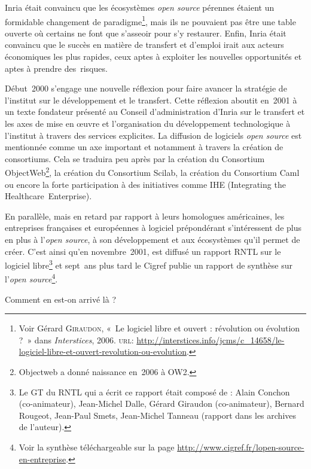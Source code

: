\documentclass{FramateX}
\begin{document}
\begin{refsection}
Inria était convaincu que les écosystèmes \textit{open source} pérennes
étaient un formidable changement de
paradigme\footnote{Voir Gérard \textsc{Giraudon}, «~Le
logiciel libre et ouvert : révolution ou évolution ?~» dans \textit{Interstices}, 2006. \textsc{url}: \url{http://interstices.info/jcms/c\_14658/le-logiciel-libre-et-ouvert-revolution-ou-evolution}.}, mais ils ne pouvaient pas être une table ouverte où certains ne font que
s'asseoir pour s'y restaurer. Enfin, Inria était convaincu que le
succès en matière de transfert et d'emploi irait aux acteurs
économiques les plus rapides, ceux aptes à exploiter les nouvelles
opportunités et aptes à prendre des~risques.

Début~2000 s'engage une nouvelle réflexion pour faire avancer la
stratégie de l'institut sur le développement et le transfert. Cette
réflexion aboutit en~2001 à un texte fondateur présenté au Conseil
d'administration d'Inria sur le transfert et les axes de mise en œuvre
et l'organisation du développement technologique à l'institut à travers
des services explicites. La diffusion de logiciels \textit{open source}
est mentionnée comme un axe important et notamment à travers la
création de consortiums. Cela se traduira peu après par la création du
Consortium ObjectWeb\footnote{Objectweb a
donné naissance en~2006 à OW2.}, la création du Consortium Scilab, la
création du Consortium Caml ou encore la forte participation à des
initiatives comme IHE (Integrating the Healthcare~Enterprise).


En parallèle, mais en retard par rapport à leurs homologues américaines,
les entreprises françaises et européennes à logiciel prépondérant
s'intéressent de plus en plus à l'\textit{open source}, à son
développement et aux écosystèmes qu'il permet de créer. C'est ainsi
qu'en novembre~2001, est diffusé un rapport RNTL sur le logiciel
libre\footnote{Le GT du RNTL qui a écrit ce
rapport était composé de : Alain Conchon
(co-animateur), Jean-Michel Dalle, Gérard Giraudon (co-animateur),
Bernard Rougeot, Jean-Paul Smets, Jean-Michel Tanneau (rapport dans les
archives de l'auteur).} et sept~ans plus tard le Cigref publie un
rapport de synthèse sur l'\textit{open
source}\footnote{Voir la synthèse
téléchargeable sur la page \url{http://www.cigref.fr/lopen-source-en-entreprise}.}.


\bigskip

Comment en est-on arrivé là ?


\end{refsection}
\end{document}

